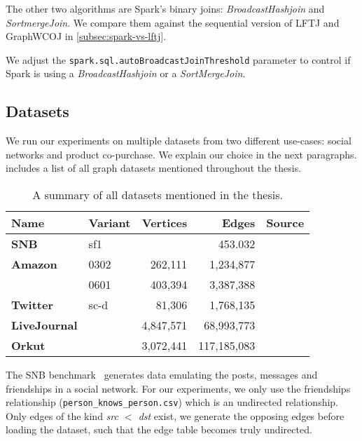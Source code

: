 The other two algorithms are Spark's binary joins: \textit{BroadcastHashjoin} and \textit{SortmergeJoin}.
We compare them against the sequential version of \textsc{LFTJ} and GraphWCOJ in \cref{subsec:spark-vs-lftj}.

We adjust the \texttt{spark.sql.autoBroadcastJoinThreshold} parameter to control
if Spark is using a \textit{BroadcastHashjoin} or a \textit{SortMergeJoin}.

\subsection{Datasets}
We run our experiments on multiple datasets from two different use-cases: social networks and product co-purchase.
We explain our choice in the next paragraphs.
 includes a list of all graph datasets mentioned throughout the thesis.

\begin{table}[]
    \centering
    \begin{tabular}{llrrl} \toprule
    Name    & Variant              &  Vertices   & Edges          & Source          \\ \midrule
    \textbf{SNB}         & sf1     &             &  453.032       & \cite{snb}      \\
    \textbf{Amazon}      & 0302    & 262,111     &  1,234,877     & \cite{snapnets} \\
    & 0601    & 403,394     &  3,387,388     & \cite{snapnets} \\
    \textbf{Twitter}     & sc-d    & 81,306      &  1,768,135     & \cite{snapnets} \\
    \textbf{LiveJournal} &         & 4,847,571   & 68,993,773     & \cite{snapnets} \\
    \textbf{Orkut}       &         & 3,072,441   & 117,185,083    & \cite{snapnets} \\ \bottomrule
    \end{tabular}
    \caption{A summary of all datasets mentioned in the thesis.}
    \label{table:datasets}
\end{table}

The SNB benchmark~\cite{snb} generates data emulating the posts, messages and friendships in a social network.
For our experiments, we only use the friendships relationship (\texttt{person\_knows\_person.csv}) which is an undirected relationship.
Only edges of the kind \textit{src $<$ dst} exist, we generate the opposing edges before loading the dataset, such
that the edge table becomes truly undirected.

